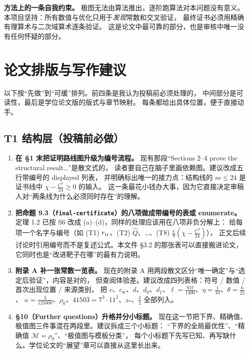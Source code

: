 \documentclass[UTF8,11pt]{ctexart}
\newcommand{\M}{\mathcal{M}}
\newcommand{\cstar}{c_{\mathrm{w}}}
\newcommand{\file}[1]{\texttt{#1}}
\begin{document}
\textbf{方法上的一条自我约束。}
极图无法由算法推出，逐阶跑算法对本问题没有意义。
本项目坚持：所有数值与优化只用于\emph{发现}常数和交叉验证，
最终证书必须用精确有理算术与二次域算术逐条验证。
这是论文中最可靠的部分，也是审核中唯一没有任何怀疑的部分。

\section{论文排版与写作建议}

以下按``先做''到``可缓''排列。前四条是我认为投稿前必须处理的，
中间部分是可读性，最后是学位论文版的版式与章节映射。
每条都给出具体位置，便于直接动手。

\subsection{T1 结构层（投稿前必做）}

\begin{enumerate}[leftmargin=2em,itemsep=4pt]
\item \textbf{在 \S1 末把证明路线图升级为编号流程。}
现有那段``Sections 2--4 prove the structural result\ldots''是散文式的，
读者要自己在脑子里画依赖图。建议改成五行带编号的 displayed 列表，
并明确标出唯一的接力点：结构线的 $m\le24$ 是证书线中 $\chi-\frac{C^2}{24}\ge0$ 的输入。
这一条最花小钱办大事，因为它直接决定审稿人对``两条线为什么必须同时存在''的理解。

\item \textbf{把命题 9.3（\file{final-certificate}）的八项做成带编号的表或 enumerate。}
定理 1.2 已按 S6 改成 (a)--(d)，同样的处理应该用在八项非负分解上：
给每项一个名字与编号（如 (T1) $r_{\rm tr}$、(T2) $\widehat Q$、\ldots、(T8) $\frac\kappa9(\chi-\frac{C^2}{24})$），
正文后续讨论时引用编号而不是复述公式。本文件 \S3.2 的那张表可以直接搬进论文，
它同时也是``改进靶子在哪''的最有力说明。

\item \textbf{附录 A 补一张常数一览表。}
现在的附录 A 用两段散文区分``唯一确定''与``选定后验证''，内容是对的，
但查阅体验差。建议改成四列表格：符号 / 数值 / 首次出现位置 / 来源类别，
把 $c$、$\cstar$、$d$、$d_0$、$d_1$、$\ell=\frac{937}{1400}$、$\eta=\frac1{10}$、$\theta=\frac6{25}$、
$\kappa=\frac3{125000}$、$\rho_0$、$41503=7^3\cdot11^2$、$z_*$、$\frac32$ 全部列入。

\item \textbf{\S10（Further questions）升格并分小标题。}
现在这一节把下界、精确值、极值图三件事混在两段里。建议拆成三个小标题：
``下界的全局最优性''、``精确值 $\M=\rho_0$''、``极值图与模板分类''，
每个小标题下先写已知、再写缺什么。学位论文的``展望''章可以直接从这里长出来。
\end{enumerate}
\end{document}
